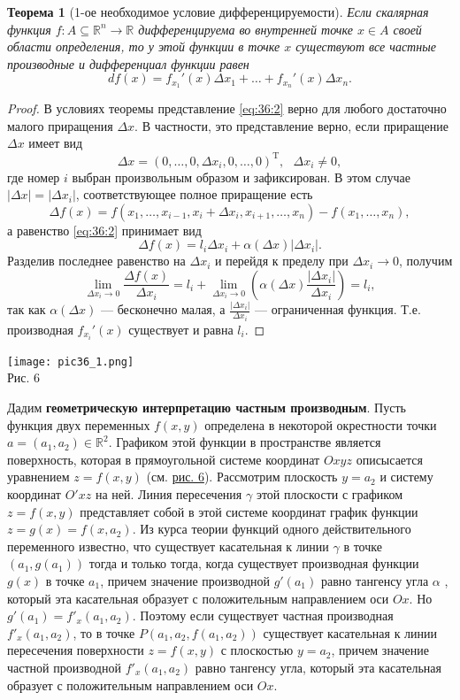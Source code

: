 \documentclass[12pt]{report}
\numberwithin{equation}{section}
\newtheorem{theorem}{Теорема}[section]
\begin{document}
\begin{theorem}[1-ое необходимое условие дифференцируемости] \label{th:36:1}
Если скалярная функция $f : A \subseteq \mathbb{R}^n \to \mathbb{R}$ дифференцируема во внутренней точке $x \in A$ своей области определения, то у этой функции в точке $x$ существуют все частные производные и дифференциал функции равен
\[ df(x) = f_{x_1}'(x) \Delta x_1 + \dots + f_{x_n}'(x) \Delta x_n.\]
\end{theorem}
\begin{proof}
В условиях теоремы представление \eqref{eq:36:2} верно для любого достаточно малого приращения $\Delta x$. В частности, это представление верно, если приращение $\Delta x$ имеет вид
\[ \Delta x = (0, \ldots, 0, \Delta x_i, 0, \ldots, 0)^{\mathrm{T}},~~~\Delta x_i \neq 0,\]
где номер $i$ выбран произвольным образом и зафиксирован. В этом случае $|\Delta x| = |\Delta x_i|$, соответствующее полное приращение есть
\[ \Delta f(x) = f(x_1, \ldots, x_{i-1}, x_i + \Delta x_i, x_{i + 1}, \ldots, x_n) - f(x_1, \ldots, x_n),\]
а равенство \eqref{eq:36:2} принимает вид
\[ \Delta f(x) = l_i \Delta x_i + \alpha (\Delta x) |\Delta x_i|.\]
Разделив последнее равенство на $\Delta x_i$ и перейдя к пределу при $\Delta x_i \to 0$, получим
\[ \lim_{\Delta x_i \to 0} \frac{\Delta f(x)}{\Delta x_i} = l_i + \lim_{\Delta x_i \to 0} \left( \alpha(\Delta x) \frac{|\Delta x_i|}{\Delta x_i} \right) = l_i,\]
так как $\alpha(\Delta x)$ --- бесконечно малая, а $\frac{|\Delta x_i|}{\Delta x_i}$ --- ограниченная функция. Т.е. производная $f_{x_i}'(x)$ существует и равна $l_i$.
\end{proof}
\begin{center}
\texttt{[image: pic36\_1.png]}\\ \label{pic:36:1}
Рис. 6
\end{center}

Дадим \textbf{геометрическую интерпретацию частным производным}. Пусть функция двух переменных $f(x,y)$ определена в некоторой окрестности точки $a = (a_1, a_2) \in \mathbb{R}^2$. Графиком этой функции в пространстве является поверхность, которая в прямоугольной системе координат $Oxyz$ описысается уравнением $z = f(x,y)$ (см. \hyperref[pic:36:1]{рис. 6}). Рассмотрим плоскость $y = a_2$ и систему координат $O'xz$ на ней. Линия пересечения $\gamma$ этой плоскости с графиком $z = f(x,y)$ представляет собой в этой системе координат график функции $z = g(x) = f(x,a_2)$. Из курса теории функций одного действительного переменного известно, что существует касательная к линии $\gamma$ в точке $(a_1, g(a_1))$ тогда и только тогда, когда существует производная функции $g(x)$ в точке $a_1$, причем значение производной $g'(a_1)$ равно тангенсу угла $\alpha$ , который эта касательная образует с положительным направлением оси $Ox$. Но $g'(a_1) = f'_x(a_1, a_2)$. Поэтому если существует частная производная $f'_x(a_1, a_2)$, то в точке $P(a_1, a_2, f(a_1, a_2))$ существует касательная к линии пересечения поверхности $z = f(x,y)$ с плоскостью $y = a_2$, причем значение частной производной $f'_x(a_1, a_2)$ равно тангенсу угла, который эта касательная образует с положительным направлением оси $Ox$.\\
\end{document}
